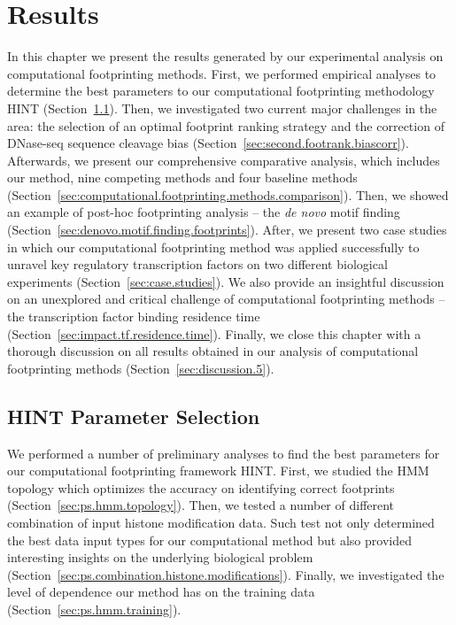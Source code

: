 \chapter{Results}
\label{cha:results}

\graphicspath{{chapter5/figs/}}

In this chapter we present the results generated by our experimental analysis on computational footprinting methods. First, we performed empirical analyses to determine the best parameters to our computational footprinting methodology HINT (Section~\ref{sec:first.hint.parameter.selection}). Then, we investigated two current major challenges in the area: the selection of an optimal footprint ranking strategy and the correction of DNase-seq sequence cleavage bias (Section~\ref{sec:second.footrank.biascorr}). Afterwards, we present our comprehensive comparative analysis, which includes our method, nine competing methods and four baseline methods (Section~\ref{sec:computational.footprinting.methods.comparison}). Then, we showed an example of post-hoc footprinting analysis -- the \emph{de novo} motif finding (Section~\ref{sec:denovo.motif.finding.footprints}). After, we present two case studies in which our computational footprinting method was applied successfully to unravel key regulatory transcription factors on two different biological experiments (Section~\ref{sec:case.studies}). We also provide an insightful discussion on an unexplored and critical challenge of computational footprinting methods -- the transcription factor binding residence time (Section~\ref{sec:impact.tf.residence.time}). Finally, we close this chapter with a thorough discussion on all results obtained in our analysis of computational footprinting methods (Section~\ref{sec:discussion.5}).

\section{HINT Parameter Selection}
\label{sec:first.hint.parameter.selection}

We performed a number of preliminary analyses to find the best parameters for our computational footprinting framework HINT. First, we studied the HMM topology which optimizes the accuracy on identifying correct footprints (Section~\ref{sec:ps.hmm.topology}). Then, we tested a number of different combination of input histone modification data. Such test not only determined the best data input types for our computational method but also provided interesting insights on the underlying biological problem (Section~\ref{sec:ps.combination.histone.modifications}). Finally, we investigated the level of dependence our method has on the training data (Section~\ref{sec:ps.hmm.training}). 

